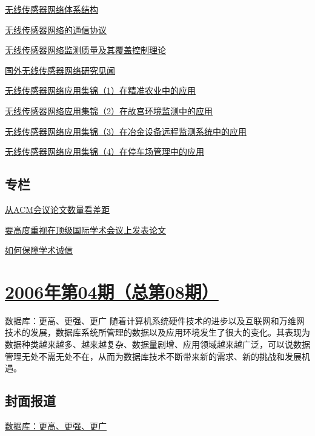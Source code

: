 \documentclass[a4paper]{article}
\begin{document}
\href{http://history.ccf.org.cn/resources/1190201776262/2010/04/15/009032.pdf}{无线传感器网络体系结构}

\href{http://history.ccf.org.cn/resources/1190201776262/2010/04/15/009043.pdf}{无线传感器网络的通信协议}

\href{http://history.ccf.org.cn/resources/1190201776262/2010/04/15/009053.pdf}{无线传感器网络监测质量及其覆盖控制理论}

\href{http://history.ccf.org.cn/resources/1190201776262/2010/04/15/009062.pdf}{国外无线传感器网络研究见闻}

\href{http://history.ccf.org.cn/resources/1190201776262/2010/04/15/009070.pdf}{无线传感器网络应用集锦（1）在精准农业中的应用}

\href{http://history.ccf.org.cn/resources/1190201776262/2010/04/15/009072.pdf}{无线传感器网络应用集锦（2）在故宫环境监测中的应用}

\href{http://history.ccf.org.cn/resources/1190201776262/2010/04/15/009075.pdf}{无线传感器网络应用集锦（3）在冶金设备远程监测系统中的应用}

\href{http://history.ccf.org.cn/resources/1190201776262/2010/04/15/009078.pdf}{无线传感器网络应用集锦（4）在停车场管理中的应用}

\subsection{专栏}
\href{http://history.ccf.org.cn/resources/1190201776262/2010/04/15/009080.pdf}{从ACM会议论文数量看差距}

\href{http://history.ccf.org.cn/resources/1190201776262/2010/04/15/009088.pdf}{要高度重视在顶级国际学术会议上发表论文}

\href{http://history.ccf.org.cn/resources/1190201776262/2010/04/15/009089.pdf}{如何保障学术诚信}


\section{\href{http://history.ccf.org.cn/sites/ccf/jsjtbbd.jsp?contentId=2542567628941}{\textbf{2006年第04期（总第08期）}}}
数据库：更高、更强、更广 随着计算机系统硬件技术的进步以及互联网和万维网技术的发展，数据库系统所管理的数据以及应用环境发生了很大的变化。其表现为数据种类越来越多、越来越复杂、数据量剧增、应用领域越来越广泛，可以说数据管理无处不需无处不在，从而为数据库技术不断带来新的需求、新的挑战和发展机遇。
\subsection{封面报道}
\href{http://history.ccf.org.cn/resources/1190201776262/2010/04/15/008016.pdf}{数据库：更高、更强、更广}
\end{document}
